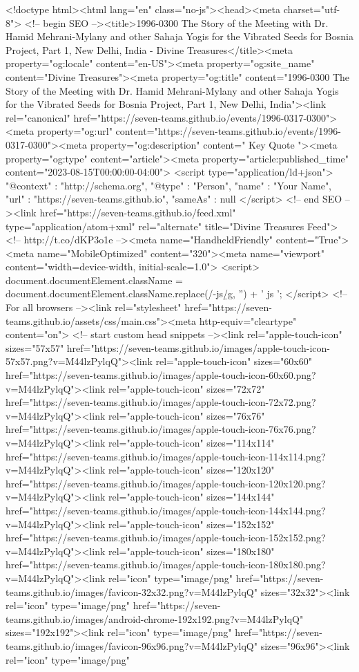 <!doctype html><html lang="en" class="no-js"><head><meta charset="utf-8"> <!-- begin SEO --><title>1996-0300 The Story of the Meeting with Dr. Hamid Mehrani-Mylany and other Sahaja Yogis for the Vibrated Seeds for Bosnia Project, Part 1, New Delhi, India - Divine Treasures</title><meta property="og:locale" content="en-US"><meta property="og:site_name" content="Divine Treasures"><meta property="og:title" content="1996-0300 The Story of the Meeting with Dr. Hamid Mehrani-Mylany and other Sahaja Yogis for the Vibrated Seeds for Bosnia Project, Part 1, New Delhi, India"><link rel="canonical" href="https://seven-teams.github.io/events/1996-0317-0300"><meta property="og:url" content="https://seven-teams.github.io/events/1996-0317-0300"><meta property="og:description" content=" Key Quote "><meta property="og:type" content="article"><meta property="article:published_time" content="2023-08-15T00:00:00-04:00"> <script type="application/ld+json"> { "@context" : "http://schema.org", "@type" : "Person", "name" : "Your Name", "url" : "https://seven-teams.github.io", "sameAs" : null } </script> <!-- end SEO --><link href="https://seven-teams.github.io/feed.xml" type="application/atom+xml" rel="alternate" title="Divine Treasures Feed"> <!-- http://t.co/dKP3o1e --><meta name="HandheldFriendly" content="True"><meta name="MobileOptimized" content="320"><meta name="viewport" content="width=device-width, initial-scale=1.0"> <script> document.documentElement.className = document.documentElement.className.replace(/\bno-js\b/g, '') + ' js '; </script> <!-- For all browsers --><link rel="stylesheet" href="https://seven-teams.github.io/assets/css/main.css"><meta http-equiv="cleartype" content="on"> <!-- start custom head snippets --><link rel="apple-touch-icon" sizes="57x57" href="https://seven-teams.github.io/images/apple-touch-icon-57x57.png?v=M44lzPylqQ"><link rel="apple-touch-icon" sizes="60x60" href="https://seven-teams.github.io/images/apple-touch-icon-60x60.png?v=M44lzPylqQ"><link rel="apple-touch-icon" sizes="72x72" href="https://seven-teams.github.io/images/apple-touch-icon-72x72.png?v=M44lzPylqQ"><link rel="apple-touch-icon" sizes="76x76" href="https://seven-teams.github.io/images/apple-touch-icon-76x76.png?v=M44lzPylqQ"><link rel="apple-touch-icon" sizes="114x114" href="https://seven-teams.github.io/images/apple-touch-icon-114x114.png?v=M44lzPylqQ"><link rel="apple-touch-icon" sizes="120x120" href="https://seven-teams.github.io/images/apple-touch-icon-120x120.png?v=M44lzPylqQ"><link rel="apple-touch-icon" sizes="144x144" href="https://seven-teams.github.io/images/apple-touch-icon-144x144.png?v=M44lzPylqQ"><link rel="apple-touch-icon" sizes="152x152" href="https://seven-teams.github.io/images/apple-touch-icon-152x152.png?v=M44lzPylqQ"><link rel="apple-touch-icon" sizes="180x180" href="https://seven-teams.github.io/images/apple-touch-icon-180x180.png?v=M44lzPylqQ"><link rel="icon" type="image/png" href="https://seven-teams.github.io/images/favicon-32x32.png?v=M44lzPylqQ" sizes="32x32"><link rel="icon" type="image/png" href="https://seven-teams.github.io/images/android-chrome-192x192.png?v=M44lzPylqQ" sizes="192x192"><link rel="icon" type="image/png" href="https://seven-teams.github.io/images/favicon-96x96.png?v=M44lzPylqQ" sizes="96x96"><link rel="icon" type="image/png" 